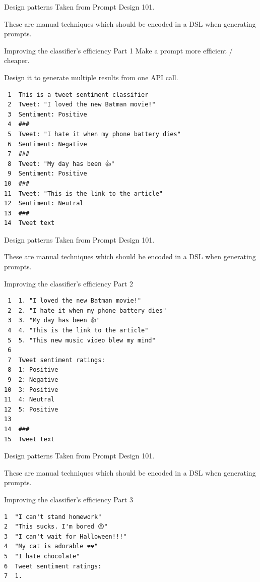 \documentclass[presentation]{beamer}
\begin{document}
\begin{frame}[label={sec:org14e9acf},fragile]{Design patterns}
 Taken from Prompt Design 101.

These are manual techniques which should be
encoded in a DSL when generating prompts.

\begin{block}{Improving the classifier’s efficiency Part 1}
Make a prompt more efficient / cheaper.

Design it to generate multiple results from
one API call.

{\tiny
\begin{verbatim}
 1  This is a tweet sentiment classifier
 2  Tweet: "I loved the new Batman movie!"
 3  Sentiment: Positive
 4  ###
 5  Tweet: "I hate it when my phone battery dies"
 6  Sentiment: Negative
 7  ###
 8  Tweet: "My day has been 👍"
 9  Sentiment: Positive
10  ###
11  Tweet: "This is the link to the article"
12  Sentiment: Neutral
13  ###
14  Tweet text
\end{verbatim}

}
\end{block}
\end{frame}

\begin{frame}[label={sec:org2082baa},fragile]{Design patterns}
 Taken from Prompt Design 101.

These are manual techniques which should be
encoded in a DSL when generating prompts.

\begin{block}{Improving the classifier’s efficiency Part 2}
{\tiny
\begin{verbatim}
 1  1. "I loved the new Batman movie!"
 2  2. "I hate it when my phone battery dies"
 3  3. "My day has been 👍"
 4  4. "This is the link to the article"
 5  5. "This new music video blew my mind"
 6  
 7  Tweet sentiment ratings:
 8  1: Positive
 9  2: Negative
10  3: Positive
11  4: Neutral
12  5: Positive
13  
14  ###
15  Tweet text
\end{verbatim}
}
\end{block}
\end{frame}

\begin{frame}[label={sec:orgdfbcfb7},fragile]{Design patterns}
 Taken from Prompt Design 101.

These are manual techniques which should be
encoded in a DSL when generating prompts.

\begin{block}{Improving the classifier’s efficiency Part 3}
{\footnotesize
\begin{verbatim}
1  "I can't stand homework"
2  "This sucks. I'm bored 😠"
3  "I can't wait for Halloween!!!"
4  "My cat is adorable ❤️❤️"
5  "I hate chocolate"
6  Tweet sentiment ratings:
7  1.
\end{verbatim}
}
\end{block}
\end{frame}
\end{document}
